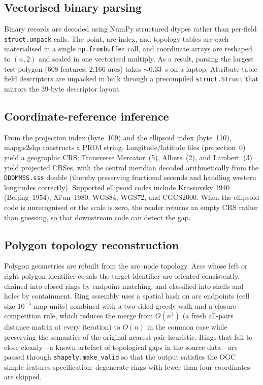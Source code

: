 \documentclass[11pt,a4paper]{article}
\begin{document}
\subsection{Vectorised binary parsing}
Binary records are decoded using NumPy structured dtypes rather than per-field \texttt{struct.unpack} calls. The point, arc-index, and topology tables are each materialised in a single \texttt{np.frombuffer} call, and coordinate arrays are reshaped to $(n,2)$ and scaled in one vectorised multiply. As a result, parsing the largest test polygon (608 features, 2{,}166 arcs) takes ${\sim}0.33$~s on a laptop. Attribute-table field descriptors are unpacked in bulk through a precompiled \texttt{struct.Struct} that mirrors the 39-byte descriptor layout.

\subsection{Coordinate-reference inference}
From the projection index (byte~109) and the ellipsoid index (byte~110), mapgis2shp constructs a PROJ string. Longitude/latitude files (projection~0) yield a geographic CRS; Transverse Mercator~(5), Albers~(2), and Lambert~(3) yield projected CRSes, with the central meridian decoded arithmetically from the \texttt{DDDMMSS.sss} double (thereby preserving fractional seconds and handling western longitudes correctly). Supported ellipsoid codes include Krassovsky 1940 (Beijing~1954), Xi'an~1980, WGS84, WGS72, and CGCS2000. When the ellipsoid code is unrecognised or the scale is zero, the reader returns an empty CRS rather than guessing, so that downstream code can detect the gap.

\subsection{Polygon topology reconstruction}
Polygon geometries are rebuilt from the arc--node topology. Arcs whose left or right polygon identifier equals the target identifier are oriented consistently, chained into closed rings by endpoint matching, and classified into shells and holes by containment. Ring assembly uses a spatial hash on arc endpoints (cell size $10^{-5}$ map units) combined with a two-sided greedy walk and a closure-competition rule, which reduces the merge from $O(n^{3})$ (a fresh all-pairs distance matrix at every iteration) to $O(n)$ in the common case while preserving the semantics of the original nearest-pair heuristic. Rings that fail to close cleanly---a known artefact of topological gaps in the source data---are passed through \texttt{shapely.make\_valid} so that the output satisfies the OGC simple-features specification; degenerate rings with fewer than four coordinates are skipped.
\end{document}
